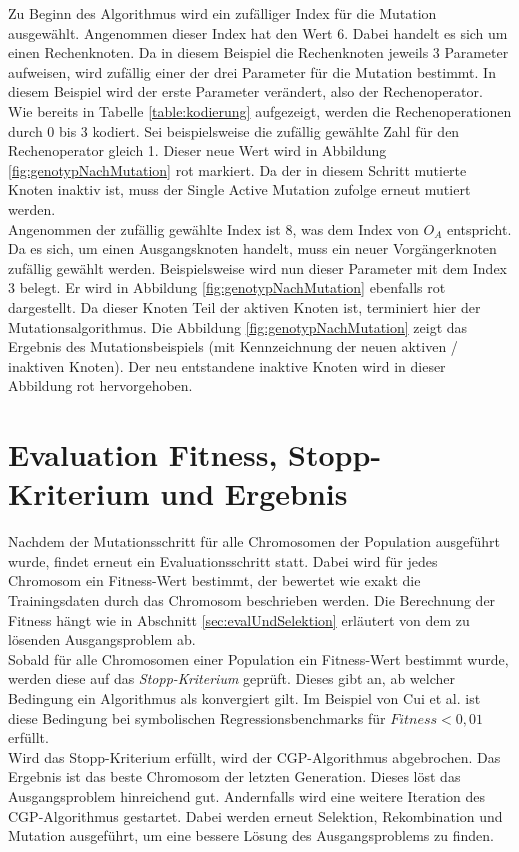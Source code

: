 Zu Beginn des Algorithmus wird ein zufälliger Index für die Mutation ausgewählt.
Angenommen dieser Index hat den Wert 6.
Dabei handelt es sich um einen Rechenknoten.
Da in diesem Beispiel die Rechenknoten jeweils 3 Parameter aufweisen, wird zufällig einer der drei Parameter für die Mutation bestimmt.
In diesem Beispiel wird der erste Parameter verändert, also der Rechenoperator.
Wie bereits in Tabelle \ref{table:kodierung} aufgezeigt, werden die Rechenoperationen durch 0 bis 3 kodiert.
Sei beispielsweise die zufällig gewählte Zahl für den Rechenoperator gleich 1.
Dieser neue Wert wird in Abbildung \ref{fig:genotypNachMutation} rot markiert.
Da der in diesem Schritt mutierte Knoten inaktiv ist, muss der Single Active Mutation zufolge erneut mutiert werden.\\
Angenommen der zufällig gewählte Index ist 8, was dem Index von $O_A$ entspricht.
Da es sich, um einen Ausgangsknoten handelt, muss ein neuer Vorgängerknoten zufällig gewählt werden.
Beispielsweise wird nun dieser Parameter mit dem Index 3 belegt.
Er wird in Abbildung \ref{fig:genotypNachMutation} ebenfalls rot dargestellt.
Da dieser Knoten Teil der aktiven Knoten ist, terminiert hier der Mutationsalgorithmus.
Die Abbildung \ref{fig:genotypNachMutation} zeigt das Ergebnis des Mutationsbeispiels (mit Kennzeichnung der neuen aktiven / inaktiven Knoten).
Der neu entstandene inaktive Knoten wird in dieser Abbildung rot hervorgehoben.


\section{Evaluation Fitness, Stopp-Kriterium und Ergebnis}
\label{sec:fitness,StopKrit,Ergebnis}

Nachdem der Mutationsschritt für alle Chromosomen der Population ausgeführt wurde, findet erneut ein Evaluationsschritt statt.
Dabei wird für jedes Chromosom ein Fitness-Wert bestimmt, der bewertet wie exakt die Trainingsdaten durch das Chromosom beschrieben werden. \cite{milad_taleby_ahvanooey_survey_2019}
Die Berechnung der Fitness hängt wie in Abschnitt \ref{sec:evalUndSelektion} erläutert von dem zu lösenden Ausgangsproblem ab.\\
Sobald für alle Chromosomen einer Population ein Fitness-Wert bestimmt wurde, werden diese auf das \emph{Stopp-Kriterium} geprüft.
Dieses gibt an, ab welcher Bedingung ein Algorithmus als konvergiert gilt.
Im Beispiel von Cui et al. ist diese Bedingung bei symbolischen Regressionsbenchmarks für $Fitness < 0,01$ erfüllt. \cite{affenzeller_positional_2024}\\
Wird das Stopp-Kriterium erfüllt, wird der CGP-Algorithmus abgebrochen.
Das Ergebnis ist das beste Chromosom der letzten Generation.
Dieses löst das Ausgangsproblem hinreichend gut.
Andernfalls wird eine weitere Iteration des CGP-Algorithmus gestartet. 
Dabei werden erneut Selektion, Rekombination und Mutation ausgeführt, um eine bessere Lösung des Ausgangsproblems zu finden.

